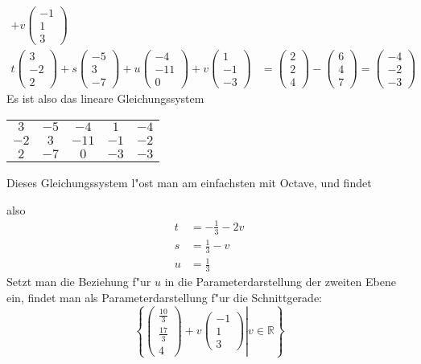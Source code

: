 \begin{loesung}
\begin{align*}
+v
\begin{pmatrix}-1\\1\\3\end{pmatrix}
\\
t
\begin{pmatrix}3\\-2\\2\end{pmatrix}
+s
\begin{pmatrix}-5\\3\\-7\end{pmatrix}
+u
\begin{pmatrix}-4\\-11\\0\end{pmatrix}
+v
\begin{pmatrix}1\\-1\\-3\end{pmatrix}
&=
\begin{pmatrix}2\\2\\4\end{pmatrix}
-
\begin{pmatrix}6\\4\\7\end{pmatrix}
=
\begin{pmatrix}-4\\-2\\-3\end{pmatrix}
\end{align*}
Es ist also das lineare Gleichungssystem
\begin{center}
\begin{tabular}{|cccc|c|}
\hline
$ 3$&$-5$&$ -4$&$ 1$&$-4$\\
$-2$&$ 3$&$-11$&$-1$&$-2$\\
$ 2$&$-7$&$  0$&$-3$&$-3$\\
\hline
\end{tabular}
\end{center}
Dieses Gleichungssystem l"ost man am einfachsten mit Octave, und findet

also
\begin{align*}
t&=-\frac13-2v\\
s&=\frac13-v\\
u&=\frac13
\end{align*}
Setzt man die Beziehung f"ur $u$ in die Parameterdarstellung der
zweiten Ebene  ein, findet man als Parameterdarstellung f"ur die
Schnittgerade:
\[
\left\{\left.
\begin{pmatrix}\frac{10}{3}\\\frac{17}{3}\\4\end{pmatrix}
+v
\begin{pmatrix}-1\\1\\3\end{pmatrix}
\right|
v\in\mathbb R
\right\}
\]


\end{loesung}
